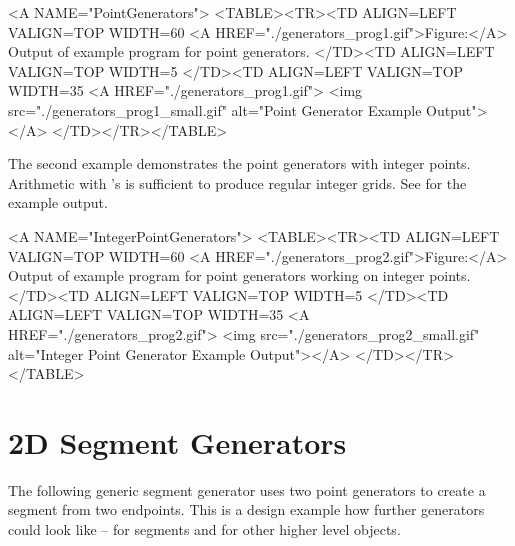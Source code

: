 \begin{ccHtmlOnly}
  <A NAME="PointGenerators">
  <TABLE><TR><TD ALIGN=LEFT VALIGN=TOP WIDTH=60%
    <A HREF="./generators_prog1.gif">Figure:</A>
    Output of example program for point generators.
  </TD><TD ALIGN=LEFT VALIGN=TOP WIDTH=5%
  </TD><TD ALIGN=LEFT VALIGN=TOP WIDTH=35%
    <A HREF="./generators_prog1.gif">
        <img src="./generators_prog1_small.gif" 
             alt="Point Generator Example Output"></A>
  </TD></TR></TABLE>
\end{ccHtmlOnly}


The second example demonstrates the point generators with integer
points. Arithmetic with 's is sufficient to produce
regular integer grids. See 
for the example output.


\begin{ccHtmlOnly}
  <A NAME="IntegerPointGenerators">
  <TABLE><TR><TD ALIGN=LEFT VALIGN=TOP WIDTH=60%
    <A HREF="./generators_prog2.gif">Figure:</A>
        Output of example program for point generators working
        on integer points.
  </TD><TD ALIGN=LEFT VALIGN=TOP WIDTH=5%
  </TD><TD ALIGN=LEFT VALIGN=TOP WIDTH=35%
    <A HREF="./generators_prog2.gif">
        <img src="./generators_prog2_small.gif" 
             alt="Integer Point Generator Example Output"></A>
  </TD></TR></TABLE>
\end{ccHtmlOnly}


\newpage
\section{2D Segment Generators}

The following generic segment generator uses two point generators to
create a segment from two endpoints. This is a design example how
further generators could look like -- for segments and for other
higher level objects.


